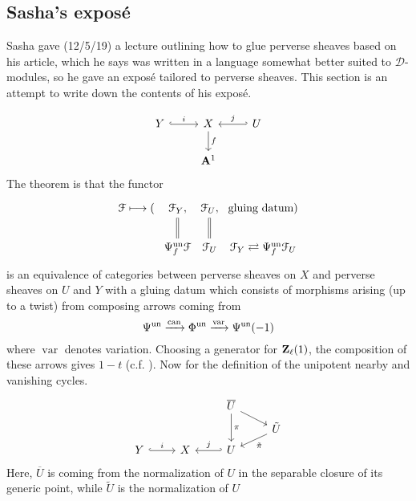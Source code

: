 \documentclass[deligne.tex]{subfiles}
\begin{document}
\subsection*{Sasha's exposé}
Sasha gave (12/5/19) a lecture outlining how to glue perverse
sheaves based on his article, which he says was written in a language
somewhat better suited to $\mathcal D$-modules, so he gave an exposé
tailored to perverse sheaves. This section is an attempt to write down the
contents of his exposé.

\begin{equation*}\begin{tikzcd}
	Y\arrow[r,hook,"i"]&X\arrow[d,"f"]&U\arrow[l,hook',"j"'] \\
	&\A^1
\end{tikzcd}\end{equation*}
The theorem is that the functor
\begin{equation*}\begin{tikzcd}[column sep=0pt]
	\mathcal F\longmapsto(&\mathcal F_Y\arrow[d,equals],
	&\mathcal F_U\arrow[d,equals],&\text{gluing datum}) \\
	&\Psi^{\mathrm{un}}_f\mathcal F
	&\mathcal F_U
	&\mathcal F_Y\rightleftarrows \Psi^{\mathrm{un}}_f\mathcal F_U
\end{tikzcd}\end{equation*}
is an equivalence of categories between perverse sheaves on $X$ and
perverse sheaves on $U$ and $Y$ with a gluing datum which consists of 
morphisms arising (up to a twist) from composing arrows coming from
\begin{equation*}
	\Psi^{\mathrm{un}}\xrightarrow{\operatorname{can}}
	\Phi^{\mathrm{un}}\xrightarrow{\operatorname{var}}
	\Psi^{\mathrm{un}}(-1)
\end{equation*}
where $\operatorname{var}$ denotes variation. Choosing a generator for
$\mathbf{Z}_\ell(1)$, the composition of these arrows gives $1-t$ 
(c.f. \cite[Exp. XIII 1.4]{SGA7}).
Now for the definition of the unipotent nearby and vanishing cycles.
\begin{equation*}\begin{tikzcd}[row sep=tiny]
	&&\overline U\arrow[dd,"\pi"]\arrow[dr] \\
	&&&\tilde U\arrow[dl,"\tilde\pi"] \\
	Y\arrow[r,hook,"i"]
	&X
	&U\arrow[l,hook',"j"']
\end{tikzcd}\end{equation*}
Here, $\overline U$ is coming from the normalization of $U$ in the separable
closure of its generic point, while $\tilde U$ is the normalization of $U$
\end{document}
